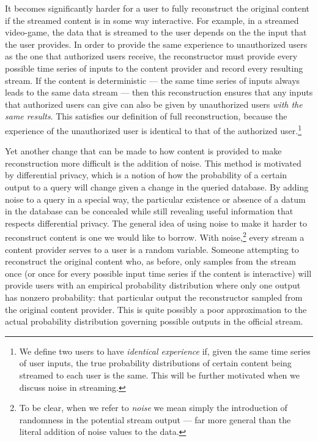 \documentclass[preprint2]{aastex}
\begin{document}
It becomes significantly harder for a user to fully reconstruct the original content if the streamed content is in some way interactive. For example, in a streamed video-game, the data that is streamed to the user depends on the the input that the user provides. In order to provide the same experience to unauthorized users as the one that authorized users receive, the reconstructor must provide every possible time series of inputs to the content provider and record every resulting stream. If the content is deterministic --- the same time series of inputs always leads to the same data stream --- then this reconstruction ensures that any inputs that authorized users can give can also be given by unauthorized users \emph{with the same results}. This satisfies our definition of full reconstruction, because the experience of the unauthorized user is identical to that of the authorized user.\footnote{We define two users to have\emph{ identical experience} if, given the same time series of user inputs, the true probability distributions of certain content being streamed to each user is the same. This will be further motivated when we discuss noise in streaming.}

Yet another change that can be made to how content is provided to make reconstruction more difficult is the addition of noise. This method is motivated by differential privacy, which is a notion of how the probability of a certain output to a query will change given a change in the queried database. By adding noise to a query in a special way, the particular existence or absence of a datum in the database can be concealed while still revealing useful information that respects differential privacy. The general idea of using noise to make it harder to reconstruct content is one we would like to borrow. With noise,\footnote{To be clear, when we refer to \emph{noise} we mean simply the introduction of randomness in the potential stream output --- far more general than the literal addition of noise values to the data.} every stream a content provider serves to a user is a random variable. Someone attempting to reconstruct the original content who, as before, only samples from the stream once (or once for every possible input time series if the content is interactive) will provide users with an empirical probability distribution where only one output has nonzero probability: that particular output the reconstructor sampled from the original content provider. This is quite possibly a poor approximation to the actual probability distribution governing possible outputs in the official stream.
\end{document}

